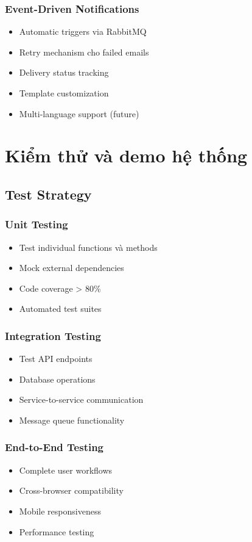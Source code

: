\documentclass[12pt,a4paper]{report}
\begin{document}
\subsection{Event-Driven Notifications}
\begin{itemize}
    \item Automatic triggers via RabbitMQ
    \item Retry mechanism cho failed emails
    \item Delivery status tracking
    \item Template customization
    \item Multi-language support (future)
\end{itemize}

\chapter{Kiểm thử và demo hệ thống}

\section{Test Strategy}

\subsection{Unit Testing}
\begin{itemize}
    \item Test individual functions và methods
    \item Mock external dependencies
    \item Code coverage > 80\%
    \item Automated test suites
\end{itemize}

\subsection{Integration Testing}
\begin{itemize}
    \item Test API endpoints
    \item Database operations
    \item Service-to-service communication
    \item Message queue functionality
\end{itemize}

\subsection{End-to-End Testing}
\begin{itemize}
    \item Complete user workflows
    \item Cross-browser compatibility
    \item Mobile responsiveness
    \item Performance testing
\end{itemize}
\end{document}
